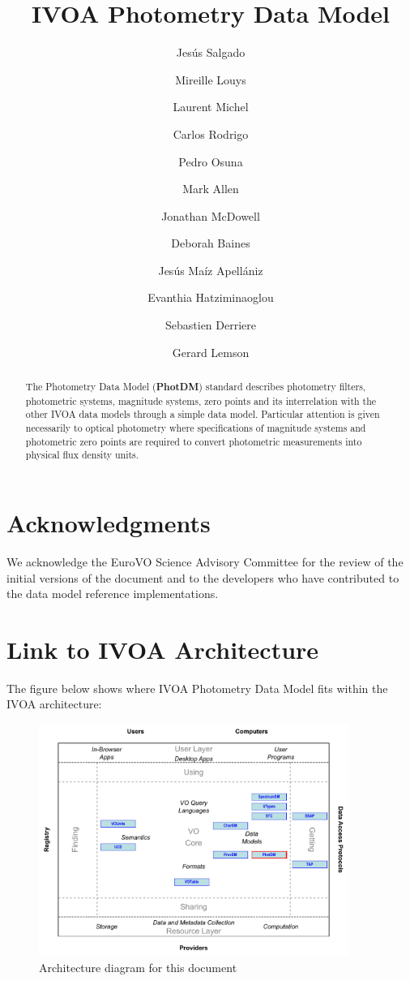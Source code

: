 \documentclass[11pt,a4paper]{ivoa}
\title{IVOA Photometry Data Model}
\author{Jesús Salgado}
\author{Mireille Louys}
\author{Laurent Michel}
\author{Carlos Rodrigo}
\author{Pedro Osuna}
\author{Mark Allen}
\author{Jonathan McDowell}
\author{Deborah Baines}
\author{Jesús Maíz Apellániz}
\author{Evanthia Hatziminaoglou}
\author{Sebastien \mbox{Derriere}}
\author{Gerard Lemson}
\begin{document}
\begin{abstract}
The Photometry Data Model (\textbf{PhotDM}) standard describes photometry filters, photometric systems, magnitude systems, zero points and its interrelation with the other IVOA data models through a simple data model. Particular attention is given necessarily to optical photometry where specifications of magnitude systems and photometric zero points are required to convert photometric measurements into physical flux density units.
\end{abstract}

\section*{Acknowledgments}
We acknowledge the EuroVO Science Advisory Committee for the review of the initial versions of the document and to the developers who have contributed to the data model reference implementations.
\pagebreak

\section*{Link to IVOA Architecture}
The figure below shows where IVOA Photometry Data Model fits within the IVOA architecture:



\begin{figure}[H] 
\centering


\includegraphics[width=0.9\textwidth]{role_diagram.pdf}
\caption{Architecture diagram for this document}
\label{fig:archdiag}
\end{figure}
\end{document}
